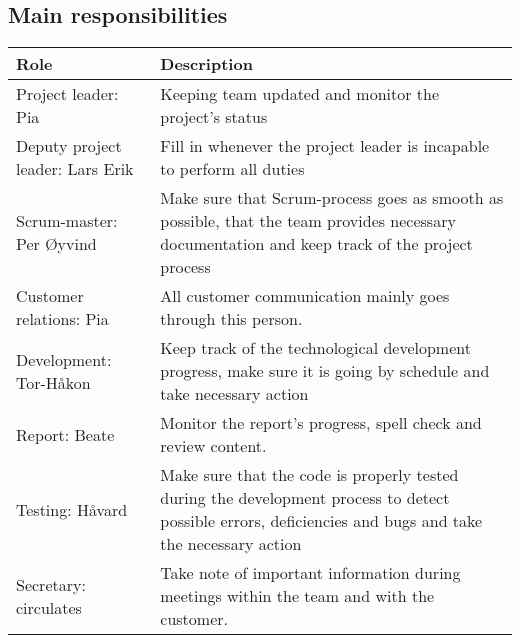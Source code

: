 \subsection{Main responsibilities}
\begin{table}[H]
\centering
{}
\begin{tabular}{|l|p{9cm}|}
\hline
\textbf{Role} & \textbf{Description}\\\hline
Project leader: Pia & Keeping team updated and monitor the project's status\\\hline
Deputy project leader: Lars Erik & Fill in whenever the project leader is incapable to perform all duties\\\hline
Scrum-master: Per Øyvind & Make sure that Scrum-process goes as smooth as possible, that the team provides necessary documentation and keep track of the project process\\\hline
Customer relations: Pia & All customer communication mainly goes through this person.\\\hline
Development: Tor-Håkon & Keep track of the technological development progress, make sure it is going by schedule and take necessary action \\\hline
Report: Beate & Monitor the report's progress, spell check and review content.\\\hline
Testing: Håvard & Make sure that the code is properly tested during the development process to detect possible errors, deficiencies and bugs and take the necessary action \\\hline
Secretary: circulates & Take note of important information during meetings within the team and with the customer.\\\hline
\end{tabular}
\end{table}